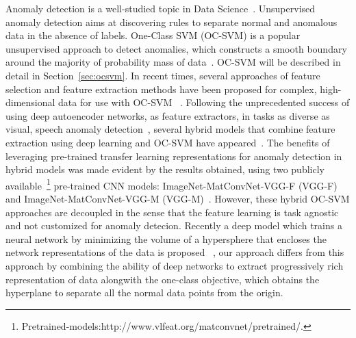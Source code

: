 Anomaly detection is a well-studied topic in Data Science~\cite{chandola2007outlier,charubook}. Unsupervised anomaly detection aims at discovering
rules to separate normal and anomalous data in the absence of labels. One-Class SVM (OC-SVM) is a popular unsupervised approach to detect anomalies, which constructs
a smooth boundary around the majority of probability mass of data~\cite{Scholkopf:2001}. OC-SVM will be  described in detail in Section~\ref{sec:ocsvm}.
In recent times, several approaches of feature selection and feature extraction methods have been proposed for complex, high-dimensional
data for use with OC-SVM ~\cite{cao2003comparison,neumann2005combined}.
Following the unprecedented success of using deep autoencoder networks, as feature extractors, in tasks as diverse as visual, speech anomaly detection~\cite{chong2017abnormal,marchi2017deep}, several hybrid models that combine feature extraction using deep learning and OC-SVM
have appeared~\cite{sohaib2017hybrid,erfani2016high}. The benefits of leveraging pre-trained transfer learning  representations for anomaly detection in hybrid models was made evident by the results obtained, using two publicly available~\footnote{Pretrained-models:http://www.vlfeat.org/matconvnet/pretrained/.} pre-trained CNN models: ImageNet-MatConvNet-VGG-F (VGG-F) and  ImageNet-MatConvNet-VGG-M (VGG-M)~\cite{andrews2016transfer}. However, these hybrid OC-SVM approaches are decoupled in the sense that the feature learning is task agnostic and not customized for anomaly detecion. Recently a deep model which trains a neural network by minimizing the volume of a hypersphere that encloses the network representations of the data is proposed ~\cite{pmlrv80ruff18a}, our approach differs from this approach by combining the ability of deep networks to extract progressively rich representation of data alongwith the one-class objective, which obtains the hyperplane to separate all the normal data points from the origin.

